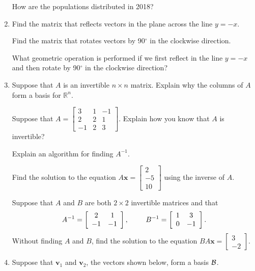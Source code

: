 \documentclass[12pt]{article}
\newcommand{\vs}[1]{\vspace{#1in}}
\newcommand{\vvec}{{\mathbf v}}
\newcommand{\xvec}{{\mathbf x}}
\newcommand{\real}{{\mathbb R}}
\newcommand{\twovec}[2]{\left[\begin{array}{r}#1 \\ #2
    \end{array}\right]}
\newcommand{\threevec}[3]{\left[\begin{array}{r}#1 \\ #2 \\ #3
  \end{array}\right]}
\newcommand{\bcal}{{\cal B}}
\begin{document}
\begin{enumerate}
  \vs{1}
  How are the populations distributed in 2018?

  \vs{1}
\item Find the matrix that reflects vectors in the plane across the
  line $y=-x$.

  \vs{1}
  Find the matrix that rotates vectors by 90$^\circ$ in the clockwise
  direction.

  \vs{1}
  What geometric operation is performed if we first reflect in the
  line $y=-x$ and then rotate by 90$^\circ$ in the clockwise
  direction?

  \vs{1}
\item Suppose that $A$ is an invertible $n\times n$ matrix.  Explain
  why the columns of $A$ form a basis for $\real^n$.

  \vs{1}
  Suppose that
  $
  A =
  \left[
    \begin{array}{rrr}
      3 & 1 & -1 \\
      2 & 2 & 1 \\
      -1 & 2 & 3
    \end{array}
  \right].
  $
  Explain how you know that $A$ is invertible?

  \vs{1}
  Explain an algorithm for finding $A^{-1}$.

  \vs{1}
  Find the solution to the equation $A\xvec = \threevec2{-5}{10}$
  using the inverse of $A$.

  \vs{1}
  Suppose that $A$ and $B$ are both $2\times2$ invertible matrices and
  that
  $$
  A^{-1} =
  \left[
    \begin{array}{cc}
      2 & 1 \\
      -1 & -1 \\
    \end{array}
  \right],\hspace*{24pt}
  B^{-1} =
  \left[
    \begin{array}{cc}
      1 & 3 \\
      0 & -1 \\
    \end{array}
  \right].
  $$
  Without finding $A$ and $B$, find the solution to the equation
  $BA\xvec = \twovec3{-2}$. 

  \vs{1}
\item Suppose that $\vvec_1$ and $\vvec_2$, the vectors shown
  below, form a basis $\bcal$.


\end{enumerate}
\end{document}

